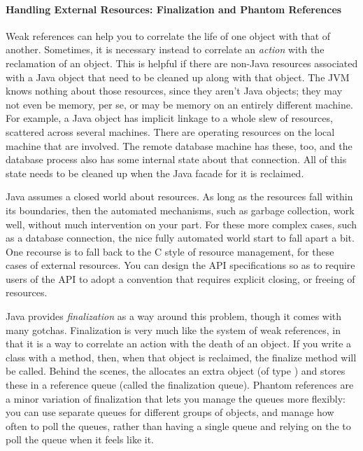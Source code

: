 \paragraph{Handling External Resources: Finalization and Phantom References}

Weak references can help you to correlate the life of one object with that of
another. Sometimes, it is necessary instead to correlate an \emph{action} with
the reclamation of an object. This is helpful if there are non-Java resources
associated with a Java object that need to be cleaned up along with that object.
The JVM knows nothing about those resources, since they aren't Java objects;
they may not even be memory, per se, or may be memory on an entirely different
machine. For example, a Java  object has implicit
linkage to a whole slew of resources, scattered across several machines. There
are operating resources on the local machine that are involved. The remote
database machine has these, too, and the database process also has some
internal state about that connection. All of this state needs to be cleaned up
when the Java facade for it is reclaimed.

Java assumes a closed world about resources. As long as the resources fall
within its boundaries, then the automated mechanisms, such as garbage
collection, work well, without much intervention on your part. For these
more complex cases, such as a database connection, the nice fully automated
world start to fall apart a bit.
One recourse is to fall back to the C style of resource management, for these
cases of external resources. You can design the API specifications so as to
require users of the API to adopt a convention that requires explicit closing,
or freeing of resources. 

Java provides \emph{finalization} as a way around this problem, though it comes
with many gotchas. Finalization is very much like the system of weak references,
in that it is a way to correlate an action with the death of an object. If you
write a class with a  method, then, when that object is
reclaimed, the finalize method will be called. Behind the scenes, the \jre
allocates an extra object (of type ) and
stores these in a reference queue (called the finalization queue). Phantom
references are a minor variation of finalization that lets you manage the queues
more flexibly: you can use separate queues for different groups of objects, and
manage how often to poll the queues, rather than having a single queue and
relying on the \jre to poll the queue when it feels like it.

